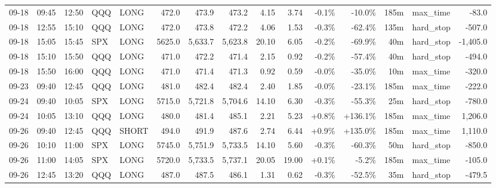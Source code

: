 \documentclass[11pt,a4paper,twoside]{article}
\begin{document}
\begin{landscape}
\begin{center}
\begin{longtable}{>{\color{txtmain}}l l l l l r r r r r r r r >{\color{txtmain}}l r}
09-18 & 09:45 & 12:50 & QQQ & LONG & 472.0 & 473.9 & 473.2 & 4.15 & 3.74 & \textcolor{lossred}{-0.1\%} & \textcolor{lossred}{-10.0\%} & 185m & max\_time & \textcolor{lossred}{-83.0} \\
09-18 & 12:55 & 15:10 & QQQ & LONG & 472.0 & 473.8 & 472.2 & 4.06 & 1.53 & \textcolor{lossred}{-0.3\%} & \textcolor{lossred}{-62.4\%} & 135m & hard\_stop & \textcolor{lossred}{-507.0} \\
09-18 & 15:05 & 15:45 & SPX & LONG & 5625.0 & 5,633.7 & 5,623.8 & 20.10 & 6.05 & \textcolor{lossred}{-0.2\%} & \textcolor{lossred}{-69.9\%} & 40m & hard\_stop & \textcolor{lossred}{-1,405.0} \\
09-18 & 15:10 & 15:50 & QQQ & LONG & 471.0 & 472.2 & 471.4 & 2.15 & 0.92 & \textcolor{lossred}{-0.2\%} & \textcolor{lossred}{-57.4\%} & 40m & hard\_stop & \textcolor{lossred}{-494.0} \\
09-18 & 15:50 & 16:00 & QQQ & LONG & 471.0 & 471.4 & 471.3 & 0.92 & 0.59 & \textcolor{lossred}{-0.0\%} & \textcolor{lossred}{-35.0\%} & 10m & max\_time & \textcolor{lossred}{-320.0} \\
09-23 & 09:40 & 12:45 & QQQ & LONG & 481.0 & 482.4 & 482.4 & 2.40 & 1.85 & \textcolor{lossred}{-0.0\%} & \textcolor{lossred}{-23.1\%} & 185m & max\_time & \textcolor{lossred}{-222.0} \\
09-24 & 09:40 & 10:05 & SPX & LONG & 5715.0 & 5,721.8 & 5,704.6 & 14.10 & 6.30 & \textcolor{lossred}{-0.3\%} & \textcolor{lossred}{-55.3\%} & 25m & hard\_stop & \textcolor{lossred}{-780.0} \\
09-24 & 10:05 & 13:10 & QQQ & LONG & 480.0 & 481.4 & 485.1 & 2.21 & 5.23 & \textcolor{wingreen}{+0.8\%} & \textcolor{wingreen}{+136.1\%} & 185m & max\_time & \textcolor{wingreen}{1,206.0} \\
09-26 & 09:40 & 12:45 & QQQ & SHORT & 494.0 & 491.9 & 487.6 & 2.74 & 6.44 & \textcolor{wingreen}{+0.9\%} & \textcolor{wingreen}{+135.0\%} & 185m & max\_time & \textcolor{wingreen}{1,110.0} \\
09-26 & 10:10 & 11:00 & SPX & LONG & 5745.0 & 5,751.9 & 5,733.5 & 14.10 & 5.60 & \textcolor{lossred}{-0.3\%} & \textcolor{lossred}{-60.3\%} & 50m & hard\_stop & \textcolor{lossred}{-850.0} \\
09-26 & 11:00 & 14:05 & SPX & LONG & 5720.0 & 5,733.5 & 5,737.1 & 20.05 & 19.00 & \textcolor{wingreen}{+0.1\%} & \textcolor{lossred}{-5.2\%} & 185m & max\_time & \textcolor{lossred}{-105.0} \\
09-26 & 12:45 & 13:20 & QQQ & LONG & 487.0 & 487.5 & 486.1 & 1.31 & 0.62 & \textcolor{lossred}{-0.3\%} & \textcolor{lossred}{-52.5\%} & 35m & hard\_stop & \textcolor{lossred}{-479.5} \\

\end{longtable}
\end{center}
\end{landscape}
\end{document}
